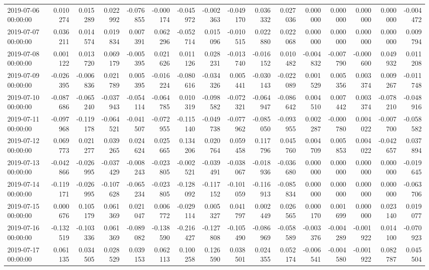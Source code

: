 \begin{tabular}{lrrrrrrrrrrrrrrr}
2019-07-06 00:00:00 & 0.010274 & 0.015289 & 0.022992 & -0.076855 & -0.000174 & -0.045972 & -0.002363 & -0.049170 & 0.036332 & 0.027036 & 0.000000 & 0.000000 & 0.000000 & 0.000000 & -0.004472 \\
2019-07-07 00:00:00 & 0.036211 & 0.014574 & 0.019834 & 0.007391 & 0.062296 & -0.052714 & 0.015096 & -0.010515 & 0.022880 & 0.022068 & 0.000000 & 0.000000 & 0.000000 & 0.000000 & 0.009794 \\
2019-07-08 00:00:00 & 0.001122 & 0.013720 & 0.069179 & -0.005395 & 0.021626 & 0.011126 & 0.028231 & -0.013740 & -0.016152 & 0.010482 & -0.004832 & -0.007790 & -0.000600 & 0.049932 & 0.011208 \\
2019-07-09 00:00:00 & -0.026395 & -0.006836 & 0.021789 & 0.005395 & -0.016224 & -0.080616 & -0.034326 & 0.005441 & -0.030143 & -0.022089 & 0.001529 & 0.005356 & 0.003374 & 0.009267 & -0.011748 \\
2019-07-10 00:00:00 & -0.087686 & -0.065240 & -0.037943 & -0.054114 & -0.064785 & 0.010319 & -0.098582 & -0.072321 & -0.064947 & -0.086642 & 0.004510 & 0.007442 & 0.003374 & -0.078210 & -0.048916 \\
2019-07-11 00:00:00 & -0.097968 & -0.119178 & -0.064521 & -0.041507 & -0.072955 & -0.115140 & -0.049738 & -0.077962 & -0.085050 & -0.093955 & 0.002287 & -0.000780 & 0.004022 & -0.007700 & -0.058582 \\
2019-07-12 00:00:00 & 0.069773 & 0.021277 & 0.039265 & 0.024624 & 0.025665 & 0.134206 & 0.020764 & 0.059458 & 0.117796 & 0.045760 & 0.004709 & 0.005853 & 0.004022 & -0.042657 & 0.037894 \\
2019-07-13 00:00:00 & -0.042866 & -0.026995 & -0.037429 & -0.008243 & -0.023805 & -0.002521 & -0.039491 & -0.038067 & -0.018936 & -0.036680 & 0.000000 & 0.000000 & 0.000000 & 0.000000 & -0.019645 \\
2019-07-14 00:00:00 & -0.119171 & -0.026995 & -0.107628 & -0.065234 & -0.023805 & -0.128092 & -0.117152 & -0.101059 & -0.116913 & -0.085834 & 0.000000 & 0.000000 & 0.000000 & 0.000000 & -0.063706 \\
2019-07-15 00:00:00 & 0.000676 & 0.105179 & 0.061369 & 0.021047 & 0.006772 & -0.029114 & 0.005327 & 0.041797 & 0.002449 & 0.026565 & 0.000170 & 0.001699 & 0.000000 & 0.023140 & 0.019077 \\
2019-07-16 00:00:00 & -0.132519 & -0.103336 & 0.061369 & -0.089082 & -0.138590 & -0.216427 & -0.127808 & -0.105490 & -0.086969 & -0.058589 & -0.003376 & -0.004289 & -0.001922 & 0.014100 & -0.070923 \\
2019-07-17 00:00:00 & 0.061135 & 0.034505 & 0.028529 & 0.039153 & 0.062113 & 0.100258 & 0.126590 & 0.038501 & 0.024355 & 0.052174 & -0.006541 & -0.004580 & -0.001922 & 0.082787 & 0.045504 \\

\end{tabular}
